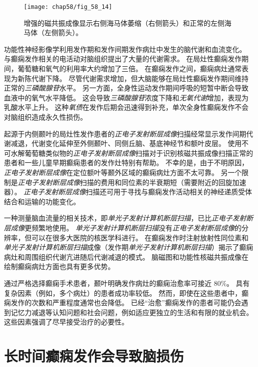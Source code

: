 \begin{figure}[htbp]
	\centering
	\texttt{[image: chap58/fig\_58\_14]}
	\caption{增强的磁共振成像显示右侧海马体萎缩（右侧箭头）和正常的左侧海马体（左侧箭头）。}
	\label{fig:58_14}
\end{figure}


功能性神经影像学利用发作期和发作间期发作病灶中发生的脑代谢和血流变化。
与癫痫发作相关的电活动对脑组织提出了大量的代谢需求。
在局灶性癫痫发作期间，葡萄糖和氧气的利用率大约增加了三倍。
在癫痫发作之间，癫痫病灶通常表现为新陈代谢下降。
尽管代谢需求增加，但大脑能够在局灶性癫痫发作期间维持正常的\textit{三磷酸腺苷}水平。
另一方面，全身性运动发作期间呼吸的短暂中断会导致血液中的氧气水平降低。
这会导致\textit{三磷酸腺苷}浓度下降和\textit{无氧代谢}增加，表现为乳酸水平上升。
这种\textit{氧债}在发作后期会迅速得到补充，单次全身性癫痫发作不会对脑组织造成永久性损伤。


起源于内侧颞叶的局灶性发作患者的\textit{正电子发射断层成像}扫描经常显示发作间期代谢减退，代谢变化延伸至外侧颞叶、同侧丘脑、基底神经节和额叶皮层。
使用不可水解葡萄糖类似物的\textit{正电子发射断层成像}扫描对于识别核磁共振成像扫描正常的患者和一些儿童早期癫痫患者的发作灶特别有帮助。
不幸的是，由于不明原因，\textit{正电子发射断层成像}在定位额叶等颞外区域的癫痫病灶方面不太可靠。
另一个限制是\textit{正电子发射断层成像}扫描的费用和同位素的半衰期短（需要附近的回旋加速器）。
\textit{正电子发射断层成像}扫描还可用于寻找与癫痫发作活动相关的神经递质受体结合和运输的功能变化。


一种测量脑血流量的相关技术，即\textit{单光子发射计算机断层扫描}，已比\textit{正电子发射断层成像}更频繁地使用。
\textit{单光子发射计算机断层扫描}没有\textit{正电子发射断层成像}的分辨率，但可以在很多大医院的核医学科进行。
在癫痫发作时注射放射性同位素和\textit{单光子发射计算机断层扫描}成像（发作期\textit{单光子发射计算机断层扫描}）揭示了癫痫病灶和周围组织代谢亢进随后代谢减退的模式。
脑磁图和功能性核磁共振成像在绘制癫痫病灶方面也具有更多优势。


通过严格选择癫痫手术患者，颞叶明确发作病灶的癫痫治愈率可接近 80\%。
具有复杂因素（例如，多个病灶）的患者成功率较低。
然而，即使在这些患者中，癫痫发作的次数和严重程度通常也会降低。
已经“治愈”癫痫发作的患者可能仍会遇到记忆力减退等认知问题和社会问题，例如适应更独立的生活和有限的就业机会。
这些因素强调了尽早接受治疗的必要性。



\section{长时间癫痫发作会导致脑损伤}

